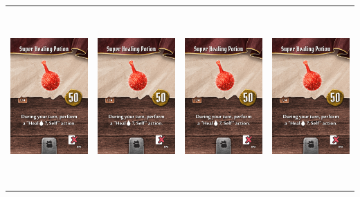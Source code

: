 \documentclass{minimal}
\begin{document}
{\begin{longtable}{llll}
\includegraphics[width=44mm,height=68mm]{./50-56/gh-055-super-healing-potion.png} &
\includegraphics[width=44mm,height=68mm]{./50-56/gh-055-super-healing-potion.png} &
\includegraphics[width=44mm,height=68mm]{./50-56/gh-055-super-healing-potion.png} &
\includegraphics[width=44mm,height=68mm]{./50-56/gh-055-super-healing-potion.png}\\ 

\end{longtable}}
\end{document}
